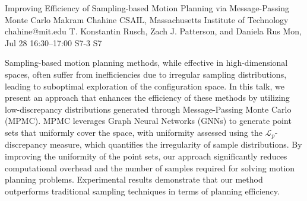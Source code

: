 \begin{talk}
  {Improving Efficiency of Sampling-based Motion Planning via Message-Passing Monte Carlo}%
  {Makram Chahine}%
  {CSAIL, Massachusetts Institute of Technology}%
  {chahine@mit.edu}%
  {T. Konstantin Rusch, Zach J. Patterson, and Daniela Rus}%
  {}%
  {Mon, Jul 28 16:30--17:00}%
  {S7-3}%
  {S7}%
  
    
   
Sampling-based motion planning methods, while effective in high-dimensional spaces, often suffer from inefficiencies due to irregular sampling distributions, leading to suboptimal exploration of the configuration space. In this talk, we present an approach that enhances the efficiency of these methods by utilizing low-discrepancy distributions generated through Message-Passing Monte Carlo (MPMC). MPMC leverages Graph Neural Networks (GNNs) to generate point sets that uniformly cover the space, with uniformity assessed using the $\mathcal{L}_p$-discrepancy measure, which quantifies the irregularity of sample distributions. By improving the uniformity of the point sets, our approach significantly reduces computational overhead and the number of samples required for solving motion planning problems. Experimental results demonstrate that our method outperforms traditional sampling techniques in terms of planning efficiency.

\medskip


\end{talk}

